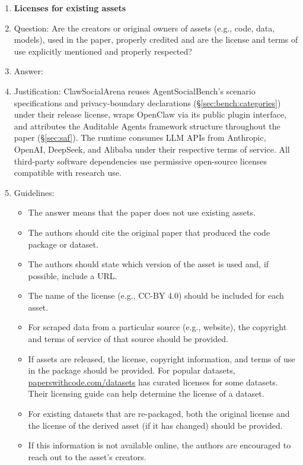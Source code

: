 \begin{enumerate}
\item {\bf Licenses for existing assets}
    \item[] Question: Are the creators or original owners of assets (e.g., code, data, models), used in the paper, properly credited and are the license and terms of use explicitly mentioned and properly respected?
    \item[] Answer: \answerYes{}
    \item[] Justification: ClawSocialArena reuses AgentSocialBench's \citep{wang2026agentsocialbench} scenario specifications and privacy-boundary declarations (\S\ref{sec:bench:categories}) under their release license, wraps OpenClaw \citep{openclaw2025} via its public plugin interface, and attributes the Auditable Agents framework structure throughout the paper (\S\ref{sec:saf}). The runtime consumes LLM APIs from Anthropic, OpenAI, DeepSeek, and Alibaba under their respective terms of service. All third-party software dependencies use permissive open-source licenses compatible with research use.
    \item[] Guidelines:
    \begin{itemize}
        \item The answer \answerNA{} means that the paper does not use existing assets.
        \item The authors should cite the original paper that produced the code package or dataset.
        \item The authors should state which version of the asset is used and, if possible, include a URL.
        \item The name of the license (e.g., CC-BY 4.0) should be included for each asset.
        \item For scraped data from a particular source (e.g., website), the copyright and terms of service of that source should be provided.
        \item If assets are released, the license, copyright information, and terms of use in the package should be provided. For popular datasets, \url{paperswithcode.com/datasets} has curated licenses for some datasets. Their licensing guide can help determine the license of a dataset.
        \item For existing datasets that are re-packaged, both the original license and the license of the derived asset (if it has changed) should be provided.
        \item If this information is not available online, the authors are encouraged to reach out to the asset's creators.
    \end{itemize}


\end{enumerate}
